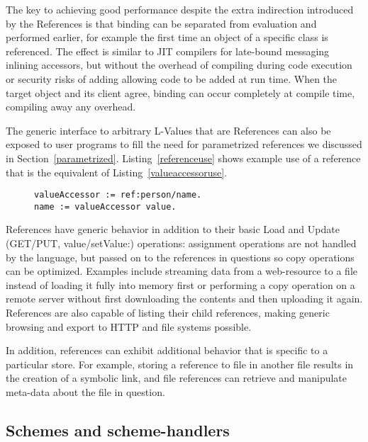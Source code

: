 \documentclass[preprint]{sigplanconf}
\begin{document}
The key to achieving good performance despite the extra indirection introduced
by the References is that binding can be separated from evaluation and performed
earlier, for example the first time an object of a specific class is referenced.  
The effect is similar to JIT compilers for late-bound
messaging inlining accessors, but without the overhead of compiling during
code execution or security risks of adding allowing code to be added at run time.
When the target object and its client agree, binding can occur completely at 
compile time, compiling away any overhead.

The generic interface to arbitrary L-Values that are References can also be 
exposed to user programs to fill the need for parametrized references we
discussed in Section~\ref{parametrized}.  Listing~\ref{referenceuse} shows
example use of a reference that is the equivalent of Listing~\ref{valueaccessoruse}.

\begin{figure}[htbp]
\begin{lstlisting}[style=numbers,label=referenceuse,caption=Using a first class reference]
valueAccessor := ref:person/name.
name := valueAccessor value.
\end{lstlisting}
\end{figure}

References have generic behavior in addition to their basic 
Load and Update (GET/PUT, value/setValue:) operations:   assignment operations
are not handled by the language, but passed on to the references in questions
so copy operations can be optimized.   Examples include streaming data from
a web-resource to a file instead of loading it fully into memory first or performing
a copy operation on a remote server without first downloading the contents
and then uploading it again. References
are also capable of listing their child references, making generic browsing and
export to HTTP and file systems possible.

In addition, references can exhibit additional behavior that is specific to a particular
store.  For example, storing a reference to file in another file results in the creation
of a symbolic link, and file references can retrieve and manipulate meta-data about
the file in question.



\subsection{Schemes and scheme-handlers}
\label{schemes}
\end{document}
